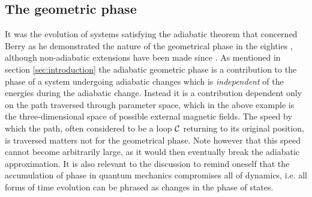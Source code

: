 \documentclass[main.tex]{subfiles}
\begin{document}
\subsection{The geometric phase}\label{sec:geophase}
It was the evolution of systems satisfying the adiabatic theorem that concerned Berry as he
demonstrated the nature of the geometrical phase in the eighties \cite{berry1984}, although non-adiabatic
extensions have been made since \cite{aharonovanandan}. As mentioned in section
\ref{sec:introduction} the adiabatic geometric phase is a contribution to the phase of a
system undergoing adiabatic changes which is \textit{independent} of the energies during the
adiabatic change\cite{erikrev}. %
Instead it is a contribution dependent only on the path traversed through parameter space,
which in the above example is the three-dimensional space of possible external magnetic
fields. The speed by which the path, often considered to be a loop \(\mathbb{\cal C}\)
returning to its original position, is traversed matters not for the geometrical phase.
Note however that this speed cannot become arbitrarily large, as it would then eventually
break the adiabatic approximation. It is also relevant to the discussion to remind oneself
that the accumulation of phase in quantum mechanics compromises all of dynamics, i.e. all forms
of time evolution can be phrased as changes in the phase of states.
\end{document}
